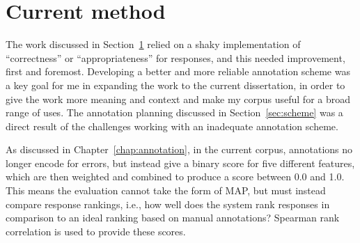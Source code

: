 
\section{Current method}
\label{sec:current-method}
The work discussed in Section~\ref{sec:current-method} relied on a shaky implementation of ``correctness'' or ``appropriateness'' for responses, and this needed improvement, first and foremost. Developing a better and more reliable annotation scheme was a key goal for me in expanding the work to the current dissertation, in order to give the work more meaning and context and make my corpus useful for a broad range of uses. The annotation planning discussed in Section~\ref{sec:scheme} was a direct result of the challenges working with an inadequate annotation scheme. 

As discussed in Chapter~\ref{chap:annotation}, in the current corpus, annotations no longer encode for errors, but instead give a binary score for five different features, which are then weighted and combined to produce a score between 0.0 and 1.0. This means the evaluation cannot take the form of MAP, but must instead compare response rankings, i.e., how well does the system rank responses in comparison to an ideal ranking based on manual annotations? Spearman rank correlation is used to provide these scores.

